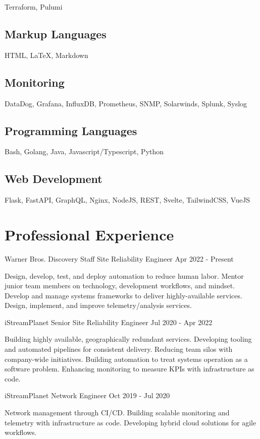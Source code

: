 \documentclass[letterpaper,11pt]{article}
\begin{document}
Terraform, Pulumi

\subsection{Markup Languages}

HTML, {\LaTeX}, Markdown

\subsection{Monitoring}

DataDog, Grafana, InfluxDB, Prometheus, SNMP, Solarwinds, Splunk, Syslog

\subsection{Programming Languages}

Bash, Golang, Java, Javascript/Typescript, Python

\subsection{Web Development}

Flask, FastAPI, GraphQL, Nginx, NodeJS, REST, Svelte, TailwindCSS, VueJS

\section{Professional Experience}

Warner Bros. Discovery Staff Site Reliability Engineer Apr 2022 - Present

Design, develop, test, and deploy automation to reduce human labor.
Mentor junior team members on technology, development workflows, and mindset.
Develop and manage systems frameworks to deliver highly-available services.
Design, implement, and improve telemetry/analysis services.

iStreamPlanet Senior Site Reliability Engineer Jul 2020 - Apr 2022

Building highly available, geographically redundant services.
Developing tooling and automated pipelines for consistent delivery.
Reducing team silos with company-wide initiatives.
Building automation to treat systems operation as a software problem.
Enhancing monitoring to measure KPIs with infrastructure as code.

iStreamPlanet Network Engineer Oct 2019 - Jul 2020

Network management through CI/CD.
Building scalable monitoring and telemetry with infrastructure as code.
Developing hybrid cloud solutions for agile workflows.
\end{document}
